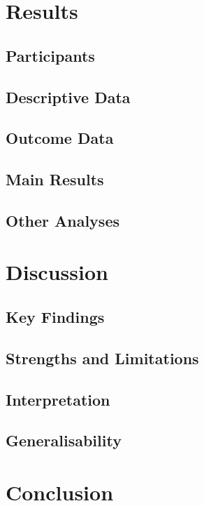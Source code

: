 \documentclass[12pt]{article}
\begin{document}
\section{Results}
\subsection{Participants}
\subsection{Descriptive Data}
\subsection{Outcome Data}
\subsection{Main Results}
\subsection{Other Analyses}

\section{Discussion}
\subsection{Key Findings}
\subsection{Strengths and Limitations}
\subsection{Interpretation}
\subsection{Generalisability}

\section{Conclusion}



\end{document}
